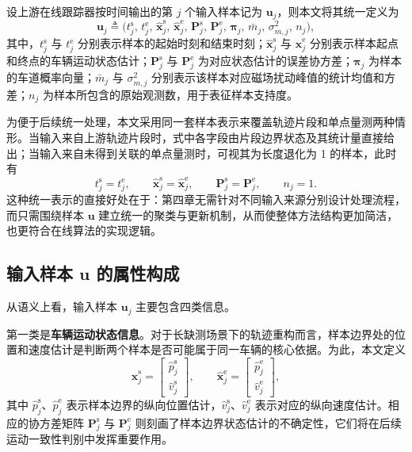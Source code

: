 \documentclass{xdupgthesis}
\begin{document}
设上游在线跟踪器按时间输出的第 $j$ 个输入样本记为 $\mathbf{u}_j$，则本文将其统一定义为
\begin{equation}
	\mathbf{u}_j \triangleq \Big(
	t_j^{\mathrm{s}},\, t_j^{\mathrm{e}},\,
	\hat{\mathbf{x}}_j^{\mathrm{s}},\, \hat{\mathbf{x}}_j^{\mathrm{e}},\,
	\mathbf{P}_j^{\mathrm{s}},\, \mathbf{P}_j^{\mathrm{e}},\,
	\boldsymbol{\pi}_j,\,
	\bar m_j,\, \sigma_{m,j}^{2},\,
	n_j
	\Big),
\end{equation}
其中，$t_j^{\mathrm{s}}$ 与 $t_j^{\mathrm{e}}$ 分别表示样本的起始时刻和结束时刻；$\hat{\mathbf{x}}_j^{\mathrm{s}}$ 与 $\hat{\mathbf{x}}_j^{\mathrm{e}}$ 分别表示样本起点和终点的车辆运动状态估计；$\mathbf{P}_j^{\mathrm{s}}$ 与 $\mathbf{P}_j^{\mathrm{e}}$ 为对应状态估计的误差协方差；$\boldsymbol{\pi}_j$ 为样本的车道概率向量；$\bar m_j$ 与 $\sigma_{m,j}^{2}$ 分别表示该样本对应磁场扰动峰值的统计均值和方差；$n_j$ 为样本所包含的原始观测数，用于表征样本支持度。

为便于后续统一处理，本文采用同一套样本表示来覆盖轨迹片段和单点量测两种情形。当输入来自上游轨迹片段时，式中各字段由片段边界状态及其统计量直接给出；当输入来自未得到关联的单点量测时，可视其为长度退化为 1 的样本，此时有
\begin{equation}
	t_j^{\mathrm{s}} = t_j^{\mathrm{e}}, \qquad
	\hat{\mathbf{x}}_j^{\mathrm{s}} = \hat{\mathbf{x}}_j^{\mathrm{e}}, \qquad
	\mathbf{P}_j^{\mathrm{s}} = \mathbf{P}_j^{\mathrm{e}}, \qquad
	n_j = 1.
\end{equation}
这种统一表示的直接好处在于：第四章无需针对不同输入来源分别设计处理流程，而只需围绕样本 $\mathbf{u}$ 建立统一的聚类与更新机制，从而使整体方法结构更加简洁，也更符合在线算法的实现逻辑。

\subsection{输入样本 $\mathbf{u}$ 的属性构成}

从语义上看，输入样本 $\mathbf{u}_j$ 主要包含四类信息。

第一类是\textbf{车辆运动状态信息}。对于长缺测场景下的轨迹重构而言，样本边界处的位置和速度估计是判断两个样本是否可能属于同一车辆的核心依据。为此，本文定义
\begin{equation}
	\hat{\mathbf{x}}_j^{\mathrm{s}}=
	\begin{bmatrix}
		\hat p_j^{\mathrm{s}}\\[2pt]
		\hat v_j^{\mathrm{s}}
	\end{bmatrix},
	\qquad
	\hat{\mathbf{x}}_j^{\mathrm{e}}=
	\begin{bmatrix}
		\hat p_j^{\mathrm{e}}\\[2pt]
		\hat v_j^{\mathrm{e}}
	\end{bmatrix},
\end{equation}
其中 $\hat p_j^{\mathrm{s}}$、$\hat p_j^{\mathrm{e}}$ 表示样本边界的纵向位置估计，$\hat v_j^{\mathrm{s}}$、$\hat v_j^{\mathrm{e}}$ 表示对应的纵向速度估计。相应的协方差矩阵 $\mathbf{P}_j^{\mathrm{s}}$ 与 $\mathbf{P}_j^{\mathrm{e}}$ 则刻画了样本边界状态估计的不确定性，它们将在后续运动一致性判别中发挥重要作用。
\end{document}
